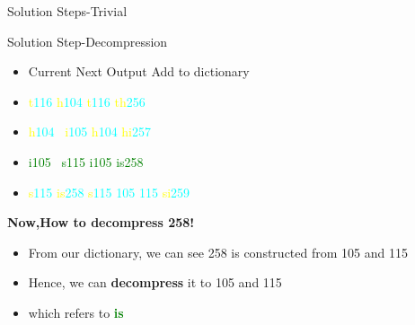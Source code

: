 \documentclass{beamer}
\begin{document}
\begin{frame}{Solution Steps-Trivial}
\begin{itemize}
    \end{itemize}
    
\end{frame}
\begin{frame}{Solution Step-Decompression}
   \begin{itemize}
        \item  \quad\quad Current \quad\quad\quad\quad Next \quad\quad\quad\quad Output \quad\quad\quad\quad Add to dictionary
    \item  \quad\quad \textcolor{yellow}{t}\:\textcolor{cyan}{116} \quad\quad\quad\qquad\: \textcolor{yellow}{h}\:\textcolor{cyan}{104} \quad\quad\qquad \textcolor{yellow}{t}\:\textcolor{cyan}{116} \quad\quad\quad\qquad\: \textcolor{yellow}{th}\:\textcolor{cyan}{256}
    \item  \quad\quad \textcolor{yellow}{h}\:\textcolor{cyan}{104} \quad\quad\quad\qquad\, \textcolor{yellow}{i}\:\textcolor{cyan}{105} \quad\quad\qquad \textcolor{yellow}{h}\:\textcolor{cyan}{104} \quad\quad\quad\qquad\: \textcolor{yellow}{hi}\:\textcolor{cyan}{257}
    \item  \quad\quad  \textcolor{green}{i}\:\textcolor{green}{105} \quad\quad\quad\qquad\;\, \textcolor{green}{s}\:\textcolor{green}{115} \quad\quad\qquad \textcolor{green}{i}\:\textcolor{green}{105} \quad\quad\quad\qquad\; \textcolor{green}{is}\:\textcolor{green}{258}
    \item  \quad\quad \textcolor{yellow}{s}\:\textcolor{cyan}{115} \quad\quad\quad\qquad\; \textcolor{yellow}{is}\:\textcolor{cyan}{258} \quad\quad\qquad \textcolor{yellow}{s}\:\textcolor{cyan}{115 105 115} \qquad\: \textcolor{yellow}{si}\:\textcolor{cyan}{259}


    \end{itemize}
    \vspace{3pt}
    \textbf{Now,How to decompress 258!}
    \begin{itemize}
        \item<1->[$\bullet$]  From our dictionary, we can see 258 is constructed from 105 and 115
        \item<2->[$\bullet$]  Hence, we can \textbf{decompress} it to 105 and 115
        \item <2->[$\bullet$] which refers to \textbf{\textcolor{green}{is}}
    \end{itemize}
    
    
\end{frame}
\end{document}
